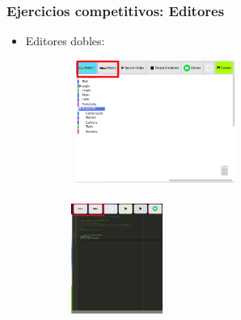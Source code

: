 \documentclass[xcolor={table}]{beamer}
\begin{document}
		\begin{frame}
			\frametitle{Ejercicios competitivos: Editores}
			\begin{itemize}
			     \item Editores dobles:
			\end{itemize}
				\begin{figure}[H]
                \centering
                \begin{subfigure}{\textwidth}
                 \includegraphics[width=5.5cm, height=4cm]{img/competitivoEditorScratch.png}
                 \label{fig:ir}
                \end{subfigure}
                \begin{subfigure}{\textwidth}
                 \includegraphics[width=3cm, height=4cm]{img/competitiveEditorJavascript.png}
                \label{fig:vision}
                \end{subfigure}
                \end{figure}
		\end{frame}
		
\end{document}
